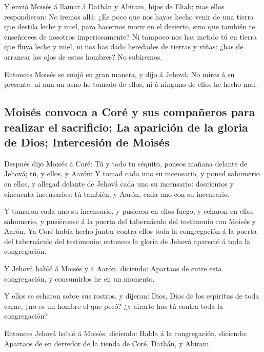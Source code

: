  Y envió Moisés á llamar á Dathán y Abiram, hijos de
Eliab; mas ellos respondieron: No iremos allá:  ¿Es poco
que nos hayas hecho venir de una tierra que destila leche y miel, para
hacernos morir en el desierto, sino que también te enseñorees de
nosotros imperiosamente?  Ni tampoco nos has metido tú en
tierra que fluya leche y miel, ni nos has dado heredades de tierras y
viñas: ¿has de arrancar los ojos de estos hombres? No subiremos.

 Entonces Moisés se enojó en gran manera, y dijo á
Jehová: No mires á su presente: ni aun un asno he tomado de ellos, ni á
ninguno de ellos he hecho mal.

\hypertarget{moisuxe9s-convoca-a-coruxe9-y-sus-compauxf1eros-para-realizar-el-sacrificio-la-apariciuxf3n-de-la-gloria-de-dios-intercesiuxf3n-de-moisuxe9s}{%
\subsection{Moisés convoca a Coré y sus compañeros para realizar el
sacrificio; La aparición de la gloria de Dios; Intercesión de
Moisés}\label{moisuxe9s-convoca-a-coruxe9-y-sus-compauxf1eros-para-realizar-el-sacrificio-la-apariciuxf3n-de-la-gloria-de-dios-intercesiuxf3n-de-moisuxe9s}}

 Después dijo Moisés á Coré: Tú y todo tu séquito, poneos
mañana delante de Jehová; tú, y ellos, y Aarón:  Y tomad
cada uno su incensario, y poned sahumerio en ellos, y allegad delante de
Jehová cada uno su incensario: doscientos y cincuenta incensarios: tú
también, y Aarón, cada uno con su incensario.

 Y tomaron cada uno su incensario, y pusieron en ellos
fuego, y echaron en ellos sahumerio, y pusiéronse á la puerta del
tabernáculo del testimonio con Moisés y Aarón.  Ya Coré
había hecho juntar contra ellos toda la congregación á la puerta del
tabernáculo del testimonio: entonces la gloria de Jehová apareció á toda
la congregación.

 Y Jehová habló á Moisés y á Aarón, diciendo:
 Apartaos de entre esta congregación, y consumirlos he en
un momento.

 Y ellos se echaron sobre sus rostros, y dijeron: Dios,
Dios de los espíritus de toda carne, ¿no es un hombre el que pecó? ¿y
airarte has tú contra toda la congregación?

 Entonces Jehová habló á Moisés, diciendo:
 Habla á la congregación, diciendo: Apartaos de en
derredor de la tienda de Coré, Dathán, y Abiram.

